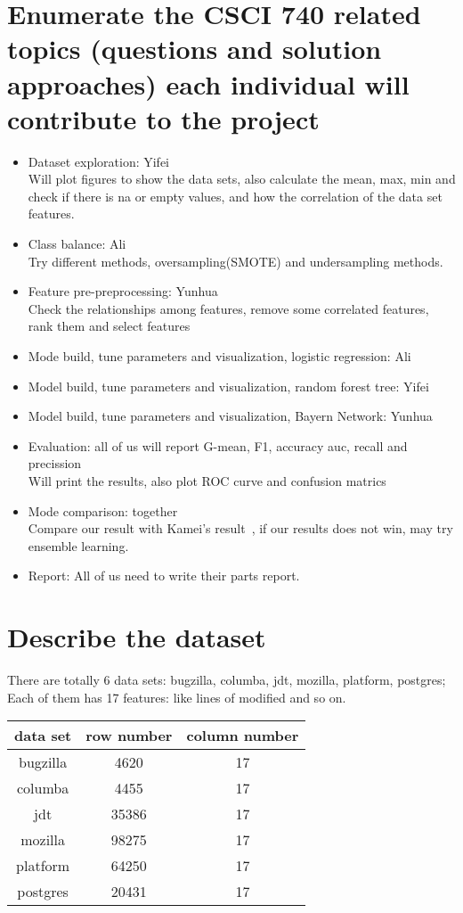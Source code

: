 \documentclass{article}
\begin{document}
\section{Enumerate the CSCI 740 related topics (questions and solution approaches) each individual will contribute
	to the project}
\begin{itemize}
	\item Dataset exploration: Yifei\\
	Will plot figures to show the data sets, also calculate the mean, max, min and check if there is na or empty values, and how the correlation of the data set features.
	\item Class balance: Ali  \\
	Try different methods, oversampling(SMOTE) and undersampling methods.
	\item Feature pre-preprocessing: Yunhua  \\
	Check the relationships among features, remove some correlated features, rank them and select features
	\item Mode build, tune parameters and visualization, logistic regression: Ali
	\item Model build, tune parameters and visualization, random forest tree: Yifei
	\item Model build, tune parameters and visualization, Bayern Network: Yunhua
	\item Evaluation: all of us will report G-mean, F1, accuracy auc, recall and precission \\
	Will print the results, also plot ROC curve and confusion matrics
	\item Mode comparison: together \\
	Compare our result with Kamei's result~\cite{kamei2012large}, if our results does not win, may try ensemble learning.
	\item Report: All of us need to write their parts report.
\end{itemize}

\section{Describe the dataset}
There are totally 6 data sets: bugzilla, columba, jdt, mozilla, platform, postgres; Each of them has 17 features: like lines of modified and so on.
\begin{center}
	\begin{tabular}{ c c c }
		data set & row number & column number \\ 
		\hline
		bugzilla & 4620 & 17 \\ 
		columba & 4455 & 17 \\  
		jdt & 35386 & 17     \\
		mozilla & 98275 & 17 \\ 
		platform & 64250 & 17 \\  
		postgres & 20431 & 17  \\
		\hline
	\end{tabular}
\end{center}
\end{document}
